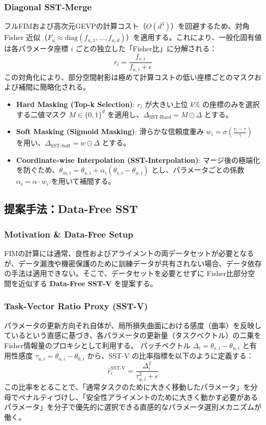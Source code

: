 \subsubsection{Diagonal SST-Merge}
フルFIMおよび高次元GEVPの計算コスト（$O(d^3)$）を回避するため、対角 Fisher 近似（$F_u \approx \text{diag}(f_{u,1}, \dots, f_{u,d})$）を適用する。これにより、一般化固有値は各パラメータ座標 $i$ ごとの独立した「Fisher比」に分解される：
\[ r_i = \frac{f_{s,i}}{f_{u,i} + \epsilon} \]
この対角化により、部分空間射影は極めて計算コストの低い座標ごとのマスクおよび補間に簡略化される。
\begin{itemize}
    \item \textbf{Hard Masking (Top-k Selection)}: $r_i$ が大きい上位 $k$\% の座標のみを選択する二値マスク $M \in \{0, 1\}^d$ を適用し、$\Delta_{\text{SST-Hard}} = M \odot \Delta$ とする。
    \item \textbf{Soft Masking (Sigmoid Masking)}: 滑らかな信頼度重み $w_i = \sigma\left(\frac{r_i - \tau}{\gamma}\right)$ を用い、$\Delta_{\text{SST-Soft}} = w \odot \Delta$ とする。
    \item \textbf{Coordinate-wise Interpolation (SST-Interpolation)}: マージ後の極端化を防ぐため、$\theta_{m,i} = \theta_{u,i} + \alpha_i (\theta_{s,i} - \theta_{u,i})$ とし、パラメータごとの係数 $\alpha_i = \alpha \cdot w_i$ を用いて補間する。
\end{itemize}

\subsection{提案手法：Data-Free SST}

\subsubsection{Motivation \& Data-Free Setup}
FIMの計算には通常、良性およびアライメントの両データセットが必要となるが、データ漏洩や機密保護のために訓練データが共有されない場合、データ依存の手法は適用できない。そこで、データセットを必要とせずに Fisher比部分空間を近似する \textbf{Data-Free SST-V} を提案する。

\subsubsection{Task-Vector Ratio Proxy (SST-V)}
パラメータの更新方向それ自体が、局所損失曲面における感度（曲率）を反映しているという直感に基づき、各パラメータの更新量（タスクベクトル）の二乗を Fisher情報量のプロキシとして利用する。
パッチベクトル $\Delta_i = \theta_{s,i} - \theta_{u,i}$ と有用性感度 $\tau_{u,i} = \theta_{u,i} - \theta_{0,i}$ から、SST-V の比率指標を以下のように定義する：
\[ \hat{r}_i^{\text{SST-V}} = \frac{\Delta_i^2}{\tau_{u,i}^2 + \epsilon} \]
この比率をとることで、「通常タスクのために大きく移動したパラメータ」を分母でペナルティづけし、「安全性アライメントのために大きく動かす必要があるパラメータ」を分子で優先的に選択できる直感的なパラメータ選別メカニズムが働く。

